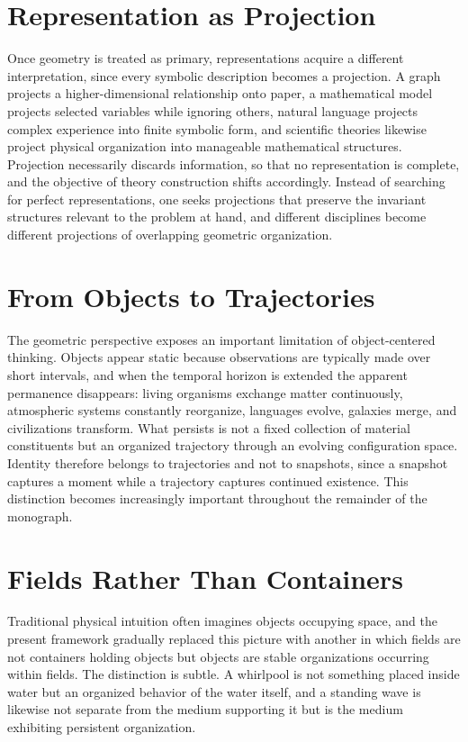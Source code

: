 \documentclass[11pt,oneside]{book}
\numberwithin{equation}{chapter}
\theoremstyle{definition}
\theoremstyle{plain}
\begin{document}
\section{Representation as Projection}

Once geometry is treated as primary, representations acquire a different interpretation, since every symbolic description becomes a projection. A graph projects a higher-dimensional relationship onto paper, a mathematical model projects selected variables while ignoring others, natural language projects complex experience into finite symbolic form, and scientific theories likewise project physical organization into manageable mathematical structures. Projection necessarily discards information, so that no representation is complete, and the objective of theory construction shifts accordingly. Instead of searching for perfect representations, one seeks projections that preserve the invariant structures relevant to the problem at hand, and different disciplines become different projections of overlapping geometric organization.

\section{From Objects to Trajectories}

The geometric perspective exposes an important limitation of object-centered thinking. Objects appear static because observations are typically made over short intervals, and when the temporal horizon is extended the apparent permanence disappears: living organisms exchange matter continuously, atmospheric systems constantly reorganize, languages evolve, galaxies merge, and civilizations transform. What persists is not a fixed collection of material constituents but an organized trajectory through an evolving configuration space. Identity therefore belongs to trajectories and not to snapshots, since a snapshot captures a moment while a trajectory captures continued existence. This distinction becomes increasingly important throughout the remainder of the monograph.

\section{Fields Rather Than Containers}

Traditional physical intuition often imagines objects occupying space, and the present framework gradually replaced this picture with another in which fields are not containers holding objects but objects are stable organizations occurring within fields. The distinction is subtle. A whirlpool is not something placed inside water but an organized behavior of the water itself, and a standing wave is likewise not separate from the medium supporting it but is the medium exhibiting persistent organization.
\end{document}
